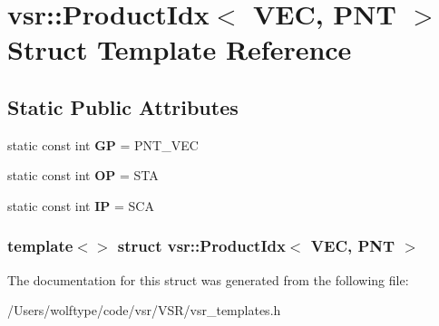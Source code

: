 \hypertarget{structvsr_1_1_product_idx_3_01_v_e_c_00_01_p_n_t_01_4}{\section{vsr\-:\-:Product\-Idx$<$ V\-E\-C, P\-N\-T $>$ Struct Template Reference}
\label{structvsr_1_1_product_idx_3_01_v_e_c_00_01_p_n_t_01_4}
}
\subsection*{Static Public Attributes}
\begin{DoxyCompactItemize}
\item 
\hypertarget{structvsr_1_1_product_idx_3_01_v_e_c_00_01_p_n_t_01_4_a0e9a8d6f478361971fa5ab10e4f0e04a}{static const int {\bfseries G\-P} = P\-N\-T\-\_\-\-V\-E\-C}\label{structvsr_1_1_product_idx_3_01_v_e_c_00_01_p_n_t_01_4_a0e9a8d6f478361971fa5ab10e4f0e04a}

\item 
\hypertarget{structvsr_1_1_product_idx_3_01_v_e_c_00_01_p_n_t_01_4_a8d57b67c142df9781049a7fc10f4545f}{static const int {\bfseries O\-P} = S\-T\-A}\label{structvsr_1_1_product_idx_3_01_v_e_c_00_01_p_n_t_01_4_a8d57b67c142df9781049a7fc10f4545f}

\item 
\hypertarget{structvsr_1_1_product_idx_3_01_v_e_c_00_01_p_n_t_01_4_a22b1158f2acc34f8172cd6f8a5fdae7c}{static const int {\bfseries I\-P} = S\-C\-A}\label{structvsr_1_1_product_idx_3_01_v_e_c_00_01_p_n_t_01_4_a22b1158f2acc34f8172cd6f8a5fdae7c}

\end{DoxyCompactItemize}
\subsubsection*{template$<$$>$ struct vsr\-::\-Product\-Idx$<$ V\-E\-C, P\-N\-T $>$}



The documentation for this struct was generated from the following file\-:\begin{DoxyCompactItemize}
\item 
/\-Users/wolftype/code/vsr/\-V\-S\-R/vsr\-\_\-templates.\-h\end{DoxyCompactItemize}
